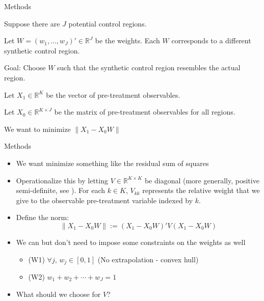 \documentclass[notes,11pt, aspectratio=169]{beamer}
\newenvironment{wideitemize}{\itemize\addtolength{\itemsep}{10pt}}{\enditemize}
\begin{document}
\begin{frame}{Methods}
    \begin{wideitemize}
        \item Suppose there are $J$ potential control regions. \pause 
        \item Let $W = (w_1, \ldots, w_J)' \in \mathbb R^J$ be the weights. Each $W$ corresponds to 
        a different synthetic control region. \pause 
        \item Goal: Choose $W$ such that the synthetic control region resembles the actual region. \pause \medskip
        \begin{wideitemize}
            \item Let $X_1 \in \mathbb R^K$ be the vector of pre-treatment observables. 
            \item Let $X_0 \in \mathbb R^{K \times J}$ be the matrix of pre-treatment observables for all regions. 
            \item We want to minimize $\| X_1 - X_0 W\|$
        \end{wideitemize}
    \end{wideitemize}
\end{frame}

\begin{frame}{Methods}
    \begin{itemize}
        \item We want minimize something like the residual sum of squares \pause 
        \item Operationalize this by letting $V \in \mathbb R^{K \times K}$ be diagonal (more generally, positive semi-definite, see \cite{abadie_synthetic_2010}). For each $k \in K$, $V_{kk}$ represents the relative weight that we give to the observable pre-treatment variable indexed by $k$. \pause 
        \item Define the norm: 
        \[\|X_1 - X_0 W\| := (X_1 - X_0 W)' V (X_1 - X_0W)\] \pause  
        \item We can but don't need to impose some constraints on the weights as well
        \begin{itemize}
            \item (W1) $\forall j$, $w_j \in [0,1]$ \quad \quad  (No extrapolation - convex hull)
            \item (W2) $w_1 + w_2 + \cdots + w_J = 1$
        \end{itemize}
        \item What should we choose for $V$? 
    \end{itemize}
\end{frame}
\end{document}
